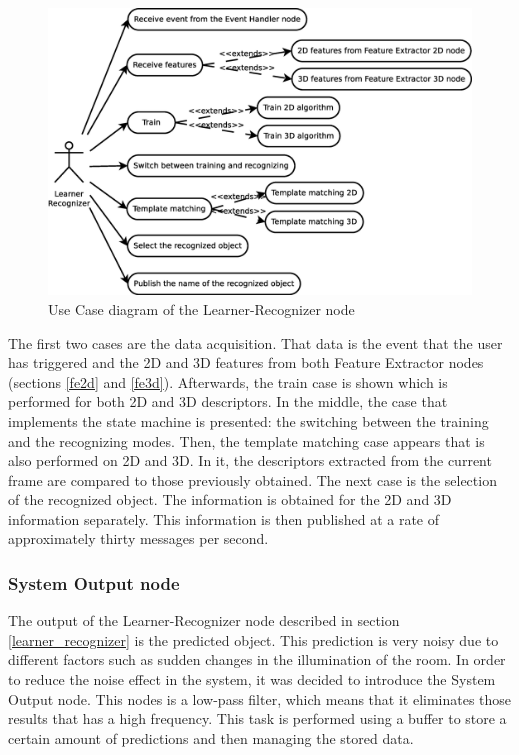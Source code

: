 	\begin{figure}[H]
		\centering
			\includegraphics[scale=0.4]{img/diagrams/uc_learner_recognizer.eps}
			\caption[Use case diagram Learner-Recognizer node]{Use Case diagram of the Learner-Recognizer node}
			\label{uc_learner_recognizer}
	\end{figure}

	The first two cases are the data acquisition. 
	That data is the event that the user has triggered and the 2D and 3D features from both Feature Extractor nodes (sections \ref{fe2d} and \ref{fe3d}).
	Afterwards, the train case is shown which is performed for both 2D and 3D descriptors.
	In the middle, the case that implements the state machine is presented: the switching between the training and the recognizing modes. 
	Then, the template matching case appears that is also performed on 2D and 3D. 
	In it, the descriptors extracted from the current frame are compared to those previously obtained.
	The next case is the selection of the recognized object. 
	The information is obtained for the 2D and 3D information separately. 
	This information is then published at a rate of approximately thirty messages per second. 



\subsubsection{System Output node}
\label{last_node}
	The output of the Learner-Recognizer node described in section \ref{learner_recognizer} is the predicted object. 
	This prediction is very noisy due to different factors such as sudden changes in the illumination of the room. 
	In order to reduce the noise effect in the system, it was decided to introduce the System Output node. 
	This nodes is a low-pass filter, which means that it eliminates those results that has a high frequency. 
	This task is performed using a buffer to store a certain amount of predictions and then managing the stored data. 
	\\


